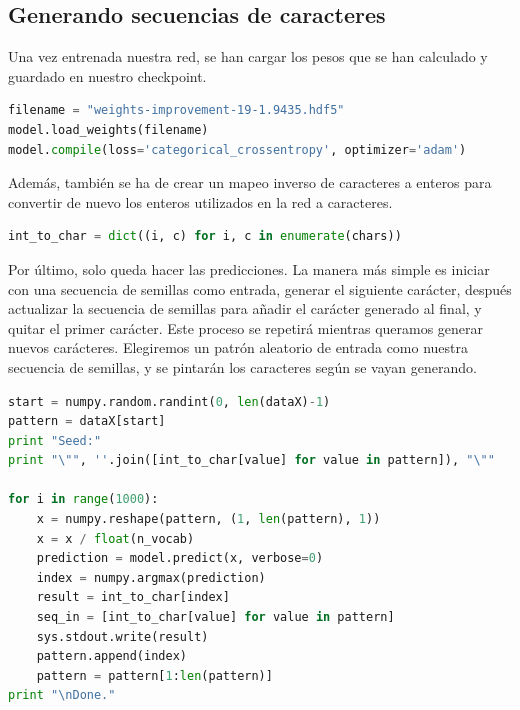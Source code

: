 \subsection{Generando secuencias de caracteres}
Una vez entrenada nuestra red, se han cargar los pesos que se han calculado y guardado en nuestro checkpoint.
\begin{lstlisting}[language=Python]
filename = "weights-improvement-19-1.9435.hdf5"
model.load_weights(filename)
model.compile(loss='categorical_crossentropy', optimizer='adam')
\end{lstlisting}
Además, también se ha de crear un mapeo inverso de caracteres a enteros para convertir de nuevo los enteros utilizados en la red a caracteres.
\begin{lstlisting}[language=Python]
int_to_char = dict((i, c) for i, c in enumerate(chars))
\end{lstlisting}
Por último, solo queda hacer las predicciones. La manera más simple es iniciar con una secuencia de semillas como entrada, generar el siguiente carácter, después actualizar la secuencia de semillas para añadir el carácter generado al final, y quitar el primer carácter. Este proceso se repetirá mientras queramos generar nuevos carácteres. Elegiremos un patrón aleatorio de entrada como nuestra secuencia de semillas, y se pintarán los caracteres según se vayan generando.
\begin{lstlisting}[language=Python]
start = numpy.random.randint(0, len(dataX)-1)
pattern = dataX[start]
print "Seed:"
print "\"", ''.join([int_to_char[value] for value in pattern]), "\""

for i in range(1000):
	x = numpy.reshape(pattern, (1, len(pattern), 1))
	x = x / float(n_vocab)
	prediction = model.predict(x, verbose=0)
	index = numpy.argmax(prediction)
	result = int_to_char[index]
	seq_in = [int_to_char[value] for value in pattern]
	sys.stdout.write(result)
	pattern.append(index)
	pattern = pattern[1:len(pattern)]
print "\nDone."
\end{lstlisting}
